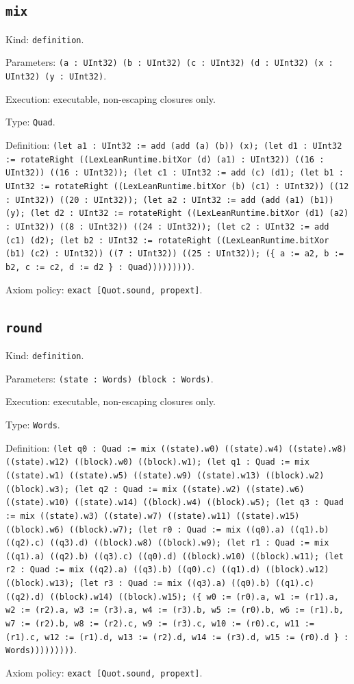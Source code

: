\documentclass[11pt]{article}
\begin{document}
\subsection*{\texttt{mix}}
\noindent Kind: \texttt{definition}.\par
\noindent Parameters: \texttt{(a : UInt32) (b : UInt32) (c : UInt32) (d : UInt32) (x : UInt32) (y : UInt32)}.\par
\noindent Execution: executable, non-escaping closures only.\par
\noindent Type: \texttt{Quad}.\par
\noindent Definition: \texttt{(let a1 : UInt32 := add (add (a) (b)) (x); (let d1 : UInt32 := rotateRight ((LexLeanRuntime.bitXor (d) (a1) : UInt32)) ((16 : UInt32)) ((16 : UInt32)); (let c1 : UInt32 := add (c) (d1); (let b1 : UInt32 := rotateRight ((LexLeanRuntime.bitXor (b) (c1) : UInt32)) ((12 : UInt32)) ((20 : UInt32)); (let a2 : UInt32 := add (add (a1) (b1)) (y); (let d2 : UInt32 := rotateRight ((LexLeanRuntime.bitXor (d1) (a2) : UInt32)) ((8 : UInt32)) ((24 : UInt32)); (let c2 : UInt32 := add (c1) (d2); (let b2 : UInt32 := rotateRight ((LexLeanRuntime.bitXor (b1) (c2) : UInt32)) ((7 : UInt32)) ((25 : UInt32)); (\{ a := a2, b := b2, c := c2, d := d2 \} : Quad)))))))))}.\par
\noindent Axiom policy: \texttt{exact [Quot.sound, propext]}.\par
\subsection*{\texttt{round}}
\noindent Kind: \texttt{definition}.\par
\noindent Parameters: \texttt{(state : Words) (block : Words)}.\par
\noindent Execution: executable, non-escaping closures only.\par
\noindent Type: \texttt{Words}.\par
\noindent Definition: \texttt{(let q0 : Quad := mix ((state).w0) ((state).w4) ((state).w8) ((state).w12) ((block).w0) ((block).w1); (let q1 : Quad := mix ((state).w1) ((state).w5) ((state).w9) ((state).w13) ((block).w2) ((block).w3); (let q2 : Quad := mix ((state).w2) ((state).w6) ((state).w10) ((state).w14) ((block).w4) ((block).w5); (let q3 : Quad := mix ((state).w3) ((state).w7) ((state).w11) ((state).w15) ((block).w6) ((block).w7); (let r0 : Quad := mix ((q0).a) ((q1).b) ((q2).c) ((q3).d) ((block).w8) ((block).w9); (let r1 : Quad := mix ((q1).a) ((q2).b) ((q3).c) ((q0).d) ((block).w10) ((block).w11); (let r2 : Quad := mix ((q2).a) ((q3).b) ((q0).c) ((q1).d) ((block).w12) ((block).w13); (let r3 : Quad := mix ((q3).a) ((q0).b) ((q1).c) ((q2).d) ((block).w14) ((block).w15); (\{ w0 := (r0).a, w1 := (r1).a, w2 := (r2).a, w3 := (r3).a, w4 := (r3).b, w5 := (r0).b, w6 := (r1).b, w7 := (r2).b, w8 := (r2).c, w9 := (r3).c, w10 := (r0).c, w11 := (r1).c, w12 := (r1).d, w13 := (r2).d, w14 := (r3).d, w15 := (r0).d \} : Words)))))))))}.\par
\noindent Axiom policy: \texttt{exact [Quot.sound, propext]}.\par
\end{document}
